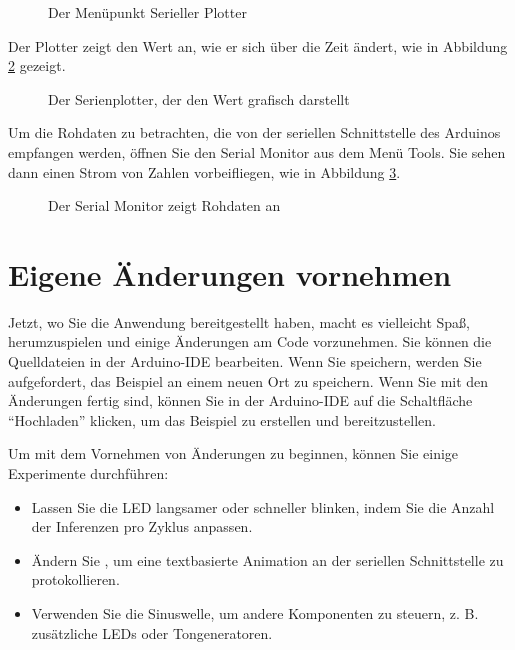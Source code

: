 \begin{figure}
    \centering
    
    \caption{Der Menüpunkt Serieller Plotter}\label{fig:ArduSerial}
\end{figure} 


Der Plotter zeigt den Wert an, wie er sich über die Zeit ändert, wie in Abbildung \ref{fig:ArduSerialGraph} gezeigt. 

\begin{figure}
    \centering
    
    \caption{Der Serienplotter, der den Wert grafisch darstellt}\label{fig:ArduSerialGraph}
\end{figure} 



Um die Rohdaten zu betrachten, die von der seriellen Schnittstelle des Arduinos empfangen werden, öffnen Sie den Serial Monitor aus dem Menü Tools. Sie sehen dann einen Strom von Zahlen vorbeifliegen, wie in Abbildung \ref{fig:ArduSerialRaw}.

\begin{figure}
    \centering
    
    \caption{Der Serial Monitor zeigt Rohdaten an}\label{fig:ArduSerialRaw}
\end{figure} 
	
 	
\section{Eigene Änderungen vornehmen}

Jetzt, wo Sie die Anwendung bereitgestellt haben, macht es vielleicht Spaß, herumzuspielen und einige Änderungen am Code vorzunehmen. Sie können die Quelldateien in der Arduino-IDE bearbeiten. Wenn Sie speichern, werden Sie aufgefordert, das Beispiel an einem neuen Ort zu speichern. Wenn Sie mit den Änderungen fertig sind, können Sie in der Arduino-IDE auf die Schaltfläche ``Hochladen'' klicken, um das Beispiel zu erstellen und bereitzustellen.

Um mit dem Vornehmen von Änderungen zu beginnen, können Sie einige Experimente durchführen:

\begin{itemize}
  \item Lassen Sie die LED langsamer oder schneller blinken, indem Sie die Anzahl der Inferenzen pro Zyklus anpassen.
  \item  Ändern Sie , um eine textbasierte Animation an der seriellen Schnittstelle zu protokollieren.
  \item  Verwenden Sie die Sinuswelle, um andere Komponenten zu steuern, z. B. zusätzliche LEDs oder Tongeneratoren.
\end{itemize}
 	
 	
 	
